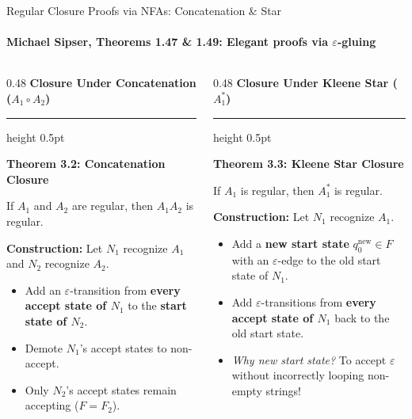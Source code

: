 \documentclass[aspectratio=169, 10pt]{beamer}
\newcommand{\colheader}[1]{%
  {\noindent\footnotesize\bfseries\color{gimpanavy}#1}%
  \vspace{0.02cm}%
  {\color{gimpanavy!30}\hrule height 0.5pt}%
  \vspace{0.05cm}%
}
\newcommand{\cardtitle}[1]{{\noindent\footnotesize\bfseries\color{gimpanavy}#1}\par\vspace{0.03cm}}
\newcommand{\greentitle}[1]{{\noindent\footnotesize\bfseries\color{accentGreen}#1}\par\vspace{0.03cm}}
\begin{document}
\begin{frame}{Regular Closure Proofs via NFAs: Concatenation \& Star}
  \framesubtitle{Michael Sipser, Theorems 1.47 \& 1.49: Elegant proofs via $\varepsilon$-gluing}
  
  \begin{columns}[T]
    \begin{column}{0.48\textwidth}
      \colheader{Closure Under Concatenation ($A_1 \circ A_2$)}
      \begin{tcolorbox}[conceptcard]
        \cardtitle{Theorem 3.2: Concatenation Closure}
        {\scriptsize
        If $A_1$ and $A_2$ are regular, then $A_1 A_2$ is regular.
        \vspace{0.03cm}
        
        \textbf{Construction:}
        Let $N_1$ recognize $A_1$ and $N_2$ recognize $A_2$.
        \begin{itemize}\setlength{\itemsep}{1.5pt}\scriptsize
          \item Add an $\varepsilon$-transition from \textbf{every accept state of $N_1$} to the \textbf{start state of $N_2$}.
          \item Demote $N_1$'s accept states to non-accept.
          \item Only $N_2$'s accept states remain accepting ($F = F_2$).
        \end{itemize}
        }
      \end{tcolorbox}
    \end{column}
    
    \begin{column}{0.48\textwidth}
      \colheader{Closure Under Kleene Star ($A_1^*$)}
      \begin{tcolorbox}[examplecard]
        \greentitle{Theorem 3.3: Kleene Star Closure}
        {\scriptsize
        If $A_1$ is regular, then $A_1^*$ is regular.
        \vspace{0.03cm}
        
        \textbf{Construction:}
        Let $N_1$ recognize $A_1$.
        \begin{itemize}\setlength{\itemsep}{1.5pt}\scriptsize
          \item Add a \textbf{new start state} $q_0^{\text{new}} \in F$ with an $\varepsilon$-edge to the old start state of $N_1$.
          \item Add $\varepsilon$-transitions from \textbf{every accept state of $N_1$} back to the old start state.
          \item \textit{Why new start state?} To accept $\varepsilon$ without incorrectly looping non-empty strings!
        \end{itemize}
        }
      \end{tcolorbox}
    \end{column}
  \end{columns}
  

\end{frame}
\end{document}
